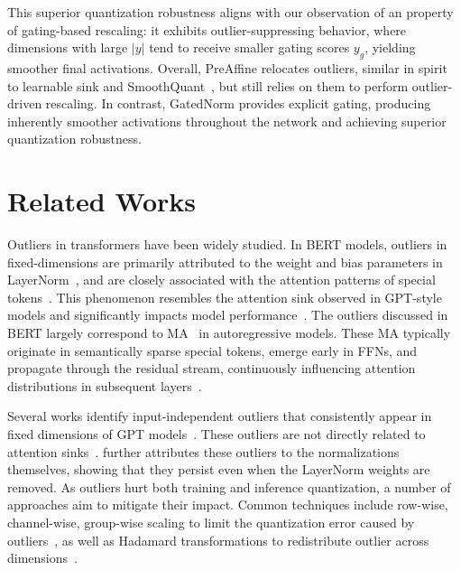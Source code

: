 \documentclass{article} %
\begin{document}
This superior quantization robustness aligns with our observation of an property of gating-based rescaling: it exhibits outlier-suppressing behavior, where dimensions with large \(|y|\) tend to receive smaller gating scores \(y_g\), yielding smoother final activations. 
Overall, PreAffine relocates outliers, similar in spirit to learnable sink and SmoothQuant~\citep{xiao2023smoothquant}, but still relies on them to perform outlier-driven rescaling. 
In contrast, GatedNorm provides explicit gating, producing inherently smoother activations throughout the network and achieving superior quantization robustness.

\section{Related Works}

Outliers in transformers have been widely studied. 
In BERT models, outliers in fixed-dimensions are primarily attributed to the weight and bias parameters in LayerNorm~\citep{bondarenko2021understanding,kovaleva2021bert,wei2022outlier}, and are closely associated with the attention patterns of special tokens~\citep{puccetti2022outlier}. 
This phenomenon resembles the attention sink observed in GPT-style models and significantly impacts model performance~\citep{kovaleva2021bert,xiao2023efficient}. 
The outliers discussed in BERT largely correspond to MA~\citep{sun2024massive,gu2024attention, yu2024unveiling} in autoregressive models. 
These MA typically originate in semantically sparse special tokens, emerge early in FFNs, and propagate through the residual stream, continuously influencing attention distributions in subsequent layers~\citep{sun2024massive,oh2024house,gu2024attention,yona2025interpreting}.

Several works identify input-independent outliers that consistently appear in fixed dimensions of GPT models~\citep{dettmers2022gpt3}. 
These outliers are not directly related to attention sinks~\citep{he2024understanding,an2025systematic}. 
\citet{he2024understanding} further attributes these outliers to the normalizations themselves, showing that they persist even when the LayerNorm weights are removed.
As outliers hurt both training and inference quantization, a number of approaches aim to mitigate their impact. 
Common techniques include row-wise, channel-wise, group-wise scaling to limit the quantization error caused by outliers~\citep{yao2022zeroquant,xiao2023smoothquant,wei2023outlier,nvfp4}, as well as Hadamard transformations to redistribute outlier across dimensions~\citep{xi2023training, wang2025bitnet}.
\end{document}

